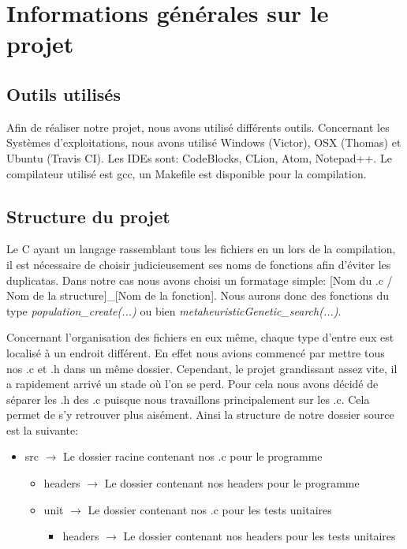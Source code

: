 \documentclass{EPUProjetPeiP}
\begin{document}
\chapter{Informations générales sur le projet}
\section{Outils utilisés}
Afin de réaliser notre projet, nous avons utilisé différents outils. Concernant les Systèmes d'exploitations, nous avons utilisé Windows (Victor), OSX (Thomas) et Ubuntu (Travis CI). Les IDEs sont: CodeBlocks, CLion, Atom, Notepad++. Le compilateur utilisé est gcc, un Makefile est disponible pour la compilation.

\section{Structure du projet}
Le C ayant un langage rassemblant tous les fichiers en un lors de la compilation, il est nécessaire de choisir judicieusement ses noms de fonctions afin d'éviter les duplicatas. Dans notre cas nous avons choisi un formatage simple: [Nom du .c / Nom de la structure]\_[Nom de la fonction]. Nous aurons donc des fonctions du type \textit{population\_create(...)} ou bien \textit{metaheuristicGenetic\_search(...)}.

Concernant l'organisation des fichiers en eux même, chaque type d'entre eux est localisé à un endroit différent. En effet nous avions commencé par mettre tous nos .c et .h dans un même dossier. Cependant, le projet grandissant assez vite, il a rapidement arrivé un stade où l'on se perd. Pour cela nous avons décidé de séparer les .h des .c puisque nous travaillons principalement sur les .c. Cela permet de s'y retrouver plus aisément. Ainsi la structure de notre dossier source est la suivante:
\begin{itemize}
	\item src $\longrightarrow$ Le dossier racine contenant nos .c pour le programme
	\begin{itemize}
		\item headers $\longrightarrow$ Le dossier contenant nos headers pour le programme
		\item unit $\longrightarrow$ Le dossier contenant nos .c pour les tests unitaires
		\begin{itemize}
			\item headers $\longrightarrow$ Le dossier contenant nos headers pour les tests unitaires\\
		\end{itemize}	
	\end{itemize}
\end{itemize}
\end{document}
